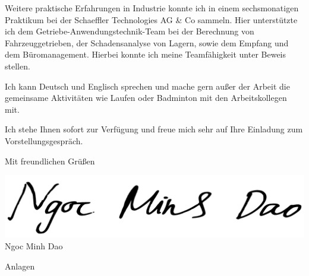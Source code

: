 \documentclass[11pt,a4paper]{letter}
\begin{document}
Weitere praktische Erfahrungen in Industrie konnte ich in einem sechsmonatigen Praktikum bei der Schaeffler Technologies AG \& Co sammeln.
Hier unterstützte ich dem Getriebe-Anwendungstechnik-Team bei der Berechnung von Fahrzeuggetrieben, der Schadensanalyse von Lagern, sowie dem Empfang und dem Büromanagement.
Hierbei konnte ich meine Teamfähigkeit unter Beweis stellen.

Ich kann Deutsch und Englisch sprechen und mache gern außer der Arbeit die gemeinsame Aktivitäten wie Laufen oder Badminton mit den Arbeitskollegen mit.

Ich stehe Ihnen sofort zur Verfügung und freue mich sehr auf Ihre Einladung zum Vorstellungsgespräch.

\vspace{1em}

Mit freundlichen Grüßen

\includegraphics[scale=0.2]{./signaturen/NgocMinhDao-Signatur.pdf}\\
Ngoc Minh Dao

Anlagen
\end{document}
